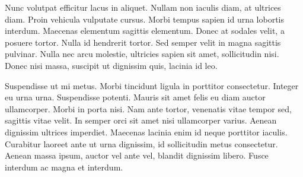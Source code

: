Nunc volutpat efficitur lacus in aliquet. Nullam non iaculis diam, at ultrices diam. Proin vehicula vulputate cursus. Morbi tempus sapien id urna lobortis interdum. Maecenas elementum sagittis elementum. Donec at sodales velit, a posuere tortor. Nulla id hendrerit tortor. Sed semper velit in magna sagittis pulvinar. Nulla nec arcu molestie, ultricies sapien sit amet, sollicitudin nisi. Donec nisi massa, suscipit ut dignissim quis, lacinia id leo.

Suspendisse ut mi metus. Morbi tincidunt ligula in porttitor consectetur. Integer eu urna urna. Suspendisse potenti. Mauris sit amet felis eu diam auctor ullamcorper. Morbi in porta nisi. Nam ante tortor, venenatis vitae tempor sed, sagittis vitae velit. In semper orci sit amet nisi ullamcorper varius. Aenean dignissim ultrices imperdiet. Maecenas lacinia enim id neque porttitor iaculis. Curabitur laoreet ante ut urna dignissim, id sollicitudin metus consectetur. Aenean massa ipsum, auctor vel ante vel, blandit dignissim libero. Fusce interdum ac magna et interdum.
